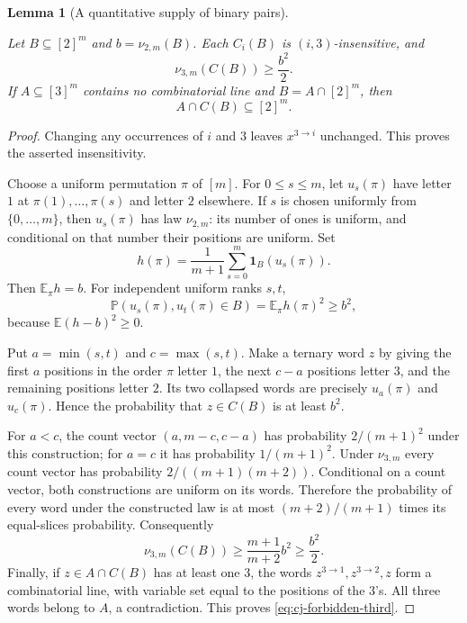 \documentclass[11pt]{amsart}
\newcommand{\one}{\mathbf 1}
\newtheorem{lemma}[theorem]{Lemma}
\theoremstyle{definition}
\theoremstyle{remark}
\numberwithin{equation}{section}
\providecommand{\lean}[1]{}
\providecommand{\leanok}{}
\begin{document}
\begin{lemma}[A quantitative supply of binary pairs]\label{cj:binary-pairs}
\lean{Auto.cj_binary_pairs_insensitive,Auto.cj_binary_pairs_bound,Auto.cj_binary_pairs_forbidden}
\leanok
Let $B\subseteq[2]^m$ and $b=\nu_{2,m}(B)$.  Each $C_i(B)$ is
$(i,3)$-insensitive, and
\begin{equation}\label{eq:cj-pair-bound}
 \nu_{3,m}(C(B))\ge\frac{b^2}{2}.
\end{equation}
If $A\subseteq[3]^m$ contains no combinatorial line and
$B=A\cap[2]^m$, then
\begin{equation}\label{eq:cj-forbidden-third}
 A\cap C(B)\subseteq[2]^m.
\end{equation}
\end{lemma}
\begin{proof}
Changing any occurrences of $i$ and $3$ leaves $x^{3\to i}$
unchanged.  This proves the asserted insensitivity.

Choose a uniform permutation $\pi$ of $[m]$.  For $0\le s\le m$,
let $u_s(\pi)$ have letter $1$ at
$\pi(1),\ldots,\pi(s)$ and letter $2$ elsewhere.  If $s$ is chosen
uniformly from $\{0,\ldots,m\}$, then $u_s(\pi)$ has law
$\nu_{2,m}$: its number of ones is uniform, and conditional on that
number their positions are uniform.  Set
\[
 h(\pi)=\frac1{m+1}\sum_{s=0}^m\one_B(u_s(\pi)).
\]
Then $\mathbb E_\pi h=b$.  For independent uniform ranks $s,t$,
\[
 \mathbb P(u_s(\pi),u_t(\pi)\in B)
 =\mathbb E_\pi h(\pi)^2\ge b^2,
\]
because $\mathbb E(h-b)^2\ge0$.

Put $a=\min(s,t)$ and $c=\max(s,t)$.  Make a ternary word $z$
by giving the first $a$ positions in the order $\pi$ letter $1$,
the next $c-a$ positions letter $3$, and the remaining positions
letter $2$.  Its two collapsed words are precisely $u_a(\pi)$ and
$u_c(\pi)$.  Hence the probability that $z\in C(B)$ is at least
$b^2$.

For $a<c$, the count vector $(a,m-c,c-a)$ has probability
$2/(m+1)^2$ under this construction; for $a=c$ it has probability
$1/(m+1)^2$.  Under $\nu_{3,m}$ every count vector has probability
$2/((m+1)(m+2))$.  Conditional on a count vector, both constructions
are uniform on its words.  Therefore the probability of every word
under the constructed law is at most
$(m+2)/(m+1)$ times its equal-slices probability.  Consequently
\[
 \nu_{3,m}(C(B))\ge\frac{m+1}{m+2}b^2\ge\frac{b^2}{2}.
\]
Finally, if $z\in A\cap C(B)$ has at least one $3$, the words
$z^{3\to1},z^{3\to2},z$ form a combinatorial line, with variable
set equal to the positions of the $3$'s.  All three words belong
to $A$, a contradiction.  This proves
\eqref{eq:cj-forbidden-third}.
\end{proof}
\end{document}
